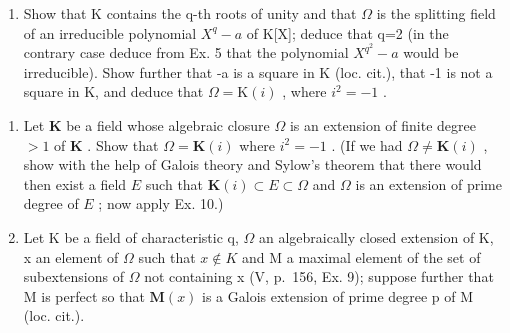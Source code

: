 \begin{enumerate}
\def\labelenumi{\alph{enumi})}
\setcounter{enumi}{1}
\tightlist
\item
  Show that K contains the q-th roots of unity and that \(\Omega\) is the splitting field of an irreducible polynomial \(X^{q}-a\) of K{[}X{]}; deduce that q=2 (in the contrary case deduce from Ex. 5 that the polynomial \(X^{q^{2}}-a\) would be irreducible). Show further that -a is a square in K (loc. cit.), that -1 is not a square in K, and deduce that \(\Omega=\mathrm{K}(i)\) , where \(i^{2}=-1\) .
\end{enumerate}

\begin{enumerate}
\def\labelenumi{\arabic{enumi})}
\setcounter{enumi}{10}
\item
  Let \(\mathbf{K}\) be a field whose algebraic closure \(\Omega\) is an extension of finite degree \(> 1\) of \(\mathbf{K}\) . Show that \(\Omega = \mathbf{K}(i)\) where \(i^2 = -1\) . (If we had \(\Omega \neq \mathbf{K}(i)\) , show with the help of Galois theory and Sylow's theorem that there would then exist a field \(E\) such that \(\mathbf{K}(i) \subset E \subset \Omega\) and \(\Omega\) is an extension of prime degree of \(E\) ; now apply Ex. 10.)
\item
  Let K be a field of characteristic q, \(\Omega\) an algebraically closed extension of K, x an element of \(\Omega\) such that \(x \notin K\) and M a maximal element of the set of subextensions of \(\Omega\) not containing x (V, p.~156, Ex. 9); suppose further that M is perfect so that \(\mathbf{M}(x)\) is a Galois extension of prime degree p of M (loc. cit.).
\end{enumerate}


